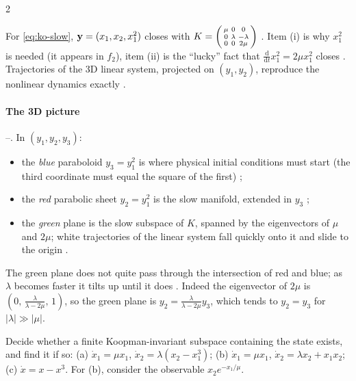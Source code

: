 \begin{paracol}{2}
\begin{casestudy}
For \eqref{eq:ko-slow}, $\mathbf{y}=(x_1,x_2,x_1^2)$ closes with
$K=\begin{psmallmatrix}\mu&0&0\\0&\lambda&-\lambda\\0&0&2\mu\end{psmallmatrix}$ .
Item (i) is why $x_1^2$ is needed (it appears in $f_2$), item (ii) is the ``lucky'' fact that
$\frac{\mathrm d}{\mathrm dt}x_1^2=2\mu x_1^2$ closes . Trajectories of the 3D linear system,
projected on $(y_1,y_2)$, reproduce the nonlinear dynamics exactly .
\end{casestudy}

\paragraph{The 3D picture} --. In $(y_1,y_2,y_3)$:
\begin{itemize}
  \item the \emph{blue} paraboloid $y_3=y_1^2$ is where physical initial conditions must start (the third
        coordinate must equal the square of the first) ;
  \item the \emph{red} parabolic sheet $y_2=y_1^2$ is the slow manifold, extended in $y_3$ ;
  \item the \emph{green} plane is the slow subspace of $K$, spanned by the eigenvectors of $\mu$ and $2\mu$;
        white trajectories of the linear system fall quickly onto it and slide to the origin
        .
\end{itemize}
The green plane does not quite pass through the intersection of red and blue; as $\lambda$ becomes faster it
tilts up until it does . Indeed the eigenvector of $2\mu$ is
$(0,\,\frac{\lambda}{\lambda-2\mu},\,1)$, so the green plane is $y_2=\frac{\lambda}{\lambda-2\mu}y_3$, which tends to
$y_2=y_3$ for $|\lambda|\gg|\mu|$.

\begin{exercise}
Decide whether a finite Koopman-invariant subspace containing the state exists, and find it if so:
(a) $\dot x_1=\mu x_1$, $\dot x_2=\lambda(x_2-x_1^3)$;
(b) $\dot x_1=\mu x_1$, $\dot x_2=\lambda x_2+x_1x_2$;
(c) $\dot x=x-x^3$.
For (b), consider the observable $x_2e^{-x_1/\mu}$.
\end{exercise}


\end{paracol}
